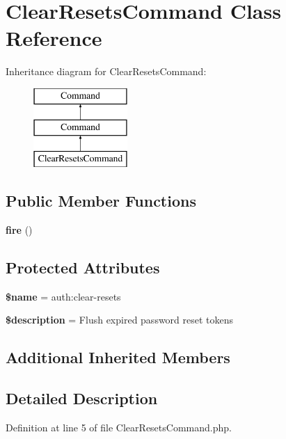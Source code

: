 \section{Clear\+Resets\+Command Class Reference}
\label{class_illuminate_1_1_auth_1_1_console_1_1_clear_resets_command}
Inheritance diagram for Clear\+Resets\+Command\+:\begin{figure}[H]
\begin{center}
\leavevmode
\includegraphics[height=3.000000cm]{class_illuminate_1_1_auth_1_1_console_1_1_clear_resets_command}
\end{center}
\end{figure}
\subsection*{Public Member Functions}
\begin{DoxyCompactItemize}
\item 
{\bf fire} ()
\end{DoxyCompactItemize}
\subsection*{Protected Attributes}
\begin{DoxyCompactItemize}
\item 
{\bf \$name} = \textquotesingle{}auth\+:clear-\/resets\textquotesingle{}
\item 
{\bf \$description} = \textquotesingle{}Flush expired password reset tokens\textquotesingle{}
\end{DoxyCompactItemize}
\subsection*{Additional Inherited Members}


\subsection{Detailed Description}


Definition at line 5 of file Clear\+Resets\+Command.\+php.




